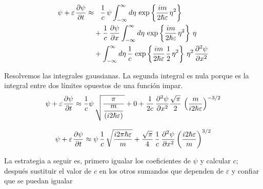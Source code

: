 \begin{align*}
   \psi + \varepsilon\kern1pt\dfrac{\partial\psi}{\partial t}
   \approx
   &\kern1pt\phantom{+} \dfrac{1}{c}\,\psi \int_{-\infty}^{\infty}
    d\eta\,\exp\left\{\dfrac{im}{2\hslash\varepsilon}\kern1pt\eta^2\right\}\\
   &+ \dfrac{1}{c}\,\dfrac{\partial\psi}{\partial x} \int_{-\infty}^{\infty}
    d\eta\,\exp\left\{\dfrac{im}{2\hslash\varepsilon}\kern1pt \eta^2\right\}\,\eta\\
   &+ \int_{-\infty}^{\infty}
    d\eta\,\dfrac{1}{c}\,\exp\left\{\dfrac{im}{2\hslash\varepsilon}\kern1pt\dfrac{1}{2}\kern1pt\eta^2\right\}\,\eta^2\kern1pt\dfrac{\partial^2\psi}{\partial x^2}
\end{align*}

Resolvemos las integrales gaussianas.
La segunda integral es nula porque es la integral entre dos límites
opuestos de una función impar.
\[
   \psi + \varepsilon\kern1pt\dfrac{\partial\psi}{\partial t}
   \approx
   \dfrac{1}{c}\psi\,\sqrt{\dfrac{\pi}{\dfrac{m}{\left(i2\hslash\varepsilon\right)}}}
   +
   0
   +
   \dfrac{1}{2c}\,\dfrac{\partial^2\psi}{\partial x^2} \dfrac{\sqrt{\pi}}{2}\,\left(\dfrac{m}{i2\hslash\varepsilon}\right)^{-3/2}
\]

\[
   \psi + \varepsilon\kern1pt\dfrac{\partial\psi}{\partial t}
   \approx
   \psi\,\dfrac{1}{c}\,\sqrt{\dfrac{i2\pi\hslash\varepsilon}{m}}
   +
   \dfrac{\sqrt{\pi}}{4}\,\dfrac{1}{c}\,\dfrac{\partial^2\psi}{\partial x^2} \left(\dfrac{i2\hslash\varepsilon}{m}\right)^{3/2}
\]

La estrategia a seguir es, primero igualar los coeficientes de $\psi$
y calcular $c$; después sustituir el valor de $c$ en los otros
sumandos que dependen de $\varepsilon$ y confiar que se puedan igualar

